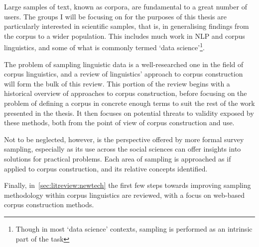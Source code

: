 Large samples of text, known as corpora, are fundamental to a great number of users.  The groups I will be focusing on for the purposes of this thesis are particularly interested in scientific samples, that is, in generalising findings from the corpus to a wider population.  This includes much work in NLP and corpus linguistics, and some of what is commonly termed `data science'\footnote{Though in most `data science' contexts, sampling is performed as an intrinsic part of the task}.


The problem of sampling linguistic data is a well-researched one in the field of corpus linguistics, and a review of linguistics' approach to corpus construction will form the bulk of this review.  This portion of the review begins with a historical overview of approaches to corpus construction, before focusing on the problem of defining a corpus in concrete enough terms to suit the rest of the work presented in the thesis.  It then focuses on potential threats to validity exposed by these methods, both from the point of view of corpus construction and use.

Not to be neglected, however, is the perspective offered by more formal survey sampling, especially as its use across the social sciences can offer insights into solutions for practical problems.  Each area of sampling is approached as if applied to corpus construction, and its relative concepts identified.

Finally, in~\ref{sec:litreview:newtech} the first few steps towards improving sampling methodology within corpus linguistics are reviewed, with a focus on web-based corpus construction methods.

